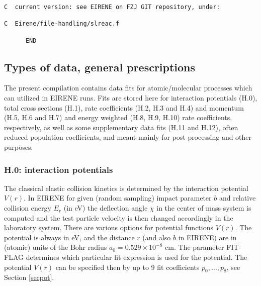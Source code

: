 \documentclass[12pt,dvipdfmx]{article}
\begin{document}
\begin{small}
\begin{verbatim}
C  current version: see EIRENE on FZJ GIT repository, under:

C  Eirene/file-handling/slreac.f

      END
\end{verbatim}\end{small}
\newpage

\subsection{Types of data, general prescriptions}\label{sec1.3}
The present compilation contains data fits for atomic/molecular processes which can utilized in EIRENE runs.
Fits are stored here for interaction potentials (H.0), total cross sections (H.1),
rate coefficients (H.2, H.3 and H.4)  and momentum (H.5, H.6 and H.7) and energy weighted (H.8, H.9, H.10) rate coefficients, respectively, as well as some
supplementary data fits (H.11 and H.12), often reduced population coefficients, and meant mainly for post processing and other purposes.

\setcounter{subsubsection}{-1}
\subsubsection{H.0: interaction potentials}\label{sec1.3.0}
The classical  elastic collision kinetics is determined by the
interaction potential $V(r)$. In EIRENE for given  (random sampling)
impact parameter $b$ and relative collision energy $E_r$ (in eV) the
deflection angle $\chi$ in the center of mass system is computed and
the test particle velocity is then changed accordingly in the
laboratory system. There are various options for potential functions
$V(r)$. The potential is always in eV, and the distance $r$ (and
also $b$ in EIRENE) are in (atomic) units of the Bohr radius
$a_0=0.529 \times 10^{-8}$ cm. The parameter FIT-FLAG determines
which particular fit expression is used for the potential. The
potential $V(r)$ can be specified then by up
to 9 fit coefficients $p_0,\dots,p_8$, see Section \ref{secpot}.\\
\end{document}
